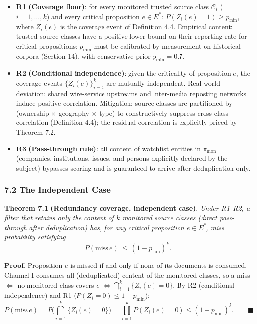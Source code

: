 \documentclass[
  11pt]{article}
\providecommand{\tightlist}{%
  \setlength{\itemsep}{0pt}\setlength{\parskip}{0pt}}
\begin{document}
\begin{itemize}
\tightlist
\item
  \textbf{R1 (Coverage floor)}: for every monitored trusted source class
  \(\mathcal{C}_i\) (\(i = 1,\dots,k\)) and every critical proposition
  \(e \in E^*\): \(P(Z_i(e) = 1) \ge p_{\min}\), where \(Z_i(e)\) is the
  coverage event of Definition 4.4. Empirical content: trusted source
  classes have a positive lower bound on their reporting rate for
  critical propositions; \(p_{\min}\) must be calibrated by measurement
  on historical corpora (Section 14), with conservative prior
  \(p_{\min} = 0.7\).
\item
  \textbf{R2 (Conditional independence)}: given the criticality of
  proposition \(e\), the coverage events \(\{Z_i(e)\}_{i=1}^k\) are
  mutually independent. Real-world deviation: shared wire-service
  upstreams and inter-media reposting networks induce positive
  correlation. Mitigation: source classes are partitioned by (ownership
  × geography × type) to constructively suppress cross-class correlation
  (Definition 4.4); the residual correlation is explicitly priced by
  Theorem 7.2.
\item
  \textbf{R3 (Pass-through rule)}: all content of watchlist entities in
  \(\pi_{\mathrm{mon}}\) (companies, institutions, issues, and persons
  explicitly declared by the subject) bypasses scoring and is guaranteed
  to arrive after deduplication only.
\end{itemize}

\subsubsection{7.2 The Independent Case}\label{the-independent-case}

\textbf{Theorem 7.1 (Redundancy coverage, independent case)}.
\emph{Under R1--R2, a filter that retains only the content of \(k\)
monitored source classes (direct pass-through after deduplication) has,
for any critical proposition \(e \in E^*\), miss probability satisfying}
\[P(\mathrm{miss}\, e) \ \le\ (1 - p_{\min})^k.\]

\textbf{Proof}. Proposition \(e\) is missed if and only if none of its
documents is consumed. Channel I consumes all (deduplicated) content of
the monitored classes, so a miss \(\iff\) no monitored class covers
\(e\) \(\iff \bigcap_{i=1}^k \{Z_i(e) = 0\}\). By R2 (conditional
independence) and R1 (\(P(Z_i = 0) \le 1 - p_{\min}\)):
\[P(\mathrm{miss}\, e) = P\Big(\bigcap_{i=1}^k \{Z_i(e) = 0\}\Big) = \prod_{i=1}^k P(Z_i(e) = 0) \le (1 - p_{\min})^k. \qquad\blacksquare\]
\end{document}
